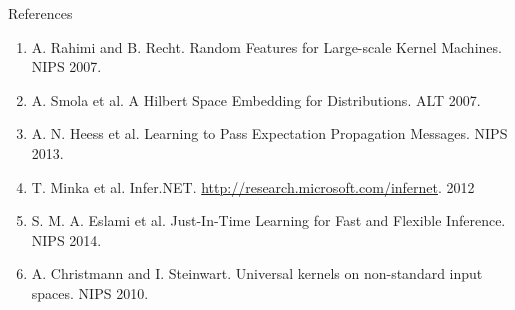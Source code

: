 \documentclass[english]{beamer}
\begin{document}
\begin{frame}
\begin{columns}[t]
\begin{block}{References}
{\footnotesize
\begin{enumerate}
\item \justifying{} { A. Rahimi and B. Recht. Random Features
for Large-scale Kernel Machines. NIPS 2007.}
\item A. Smola et al. A Hilbert Space Embedding for Distributions. ALT 2007.
\item { A. N. Heess et al. Learning to Pass Expectation Propagation Messages.
NIPS 2013. }
\item T. Minka et al. Infer.NET. \url{http://research.microsoft.com/infernet}. 2012
\item S. M. A. Eslami et al. Just-In-Time Learning for Fast and Flexible Inference.
    NIPS 2014.
\item A. Christmann and I. Steinwart. Universal kernels on non-standard input
    spaces. NIPS 2010.
\end{enumerate}
}

% 
% 


\end{block}



\end{columns}

\end{frame}
\end{document}
